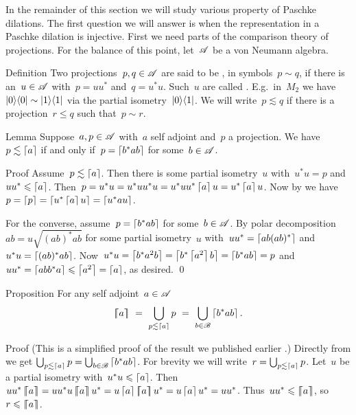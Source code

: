 \documentclass[b]{subfiles}
\begin{document}
\begin{parsec}%
\begin{point}%
In the remainder of this section we will study various property
    of Paschke dilations.
The first question we will answer is
    when the representation in a Paschke dilation is injective.
First we need parts of the comparison theory of projections.
For the balance of this point, let~$\mathscr{A}$ be a von Neumann algebra.
\end{point}
\begin{point}{Definition}%
Two projections~$p,q \in \mathscr{A}$ are said to be
    ,
    in symbols~$p \sim q$,
    if there is an~$u \in \mathscr{A}$
    with~$p = uu^*$ and~$q = u^*u$.
Such~$u$ are called .
E.g.~in~$M_2$ we have~$\left|0\right>\!\left<0\right| \sim \left|1\right>\!\left<1\right|$
    via the partial isometry~$\left|0\right>\!\left<1\right|$.
We will write~$p \lesssim q$
    if there is a projection~$r \leq q$
    such that~$p \sim r$.
\end{point}
\begin{point}{Lemma}%
Suppose~$a,p \in \mathscr{A}$ with~$a$ self adjoint and~$p$ a projection.
We have~$p \lesssim \left\lceil a\right\rceil$
    if and only if~$p = \left\lceil b^* a b\right\rceil$ for some~$b \in \mathscr{A}$.
\begin{point}{Proof}%
Assume~$p \lesssim \left\lceil a\right\rceil$.
Then there is some partial isometry~$u$
    with~$u^*u = p$ and~$uu^* \leqslant \left\lceil a\right\rceil$.
Then~$p = u^*u= u^*uu^*u = u^*uu^*\left\lceil a\right\rceil u = u^*\left\lceil a\right\rceil u$.
Now by  we have~$p = \left\lceil p\right\rceil = \left\lceil u^*\left\lceil a\right\rceil u\right\rceil=\left\lceil u^*au\right\rceil$.

For the converse, assume~$p = \left\lceil b^*ab\right\rceil$ for some~$b \in \mathscr{A}$.
By polar decomposition ~$ab = u \sqrt{(ab)^*ab}$
    for some partial isometry~$u$
    with~$uu^* = \left\lceil ab(ab)^*\right\rceil$ and~$u^*u = \left\lceil(ab)^*ab\right\rceil$.
Now~$u^*u = \left\lceil b^*a^2b\right\rceil = \left\lceil b^*\left\lceil a^2\right\rceil b\right\rceil = \left\lceil b^*ab\right\rceil=p$
and~$uu^* = \left\lceil abb^*a\right\rceil \leqslant \left\lceil a^2\right\rceil = \left\lceil a\right\rceil$, as desired. \qed
\end{point}
\end{point}
\begin{point}{Proposition}%
For any self adjoint~$a \in \mathscr{A}$
\begin{equation*}
    \left\lceil\!\!\left\lceil a\right\rceil\!\!\right\rceil \ =\  \bigcup_{p \lesssim \left\lceil a\right\rceil} p
\ = \ \bigcup_{b \in \mathscr{B}} \left\lceil b^*ab\right\rceil.
\end{equation*}
\begin{point}{Proof}%
(This is a simplified proof of the result we published
earlier \cite[Thm.~28 sub 1]{wwpaschke}.)
Directly from 
    we get $\bigcup_{p \lesssim \left\lceil a\right\rceil} p = \bigcup_{b \in \mathscr{B}} \left\lceil b^*ab\right\rceil$.
For brevity we will write~$r = \bigcup_{p \lesssim \left\lceil a\right\rceil} p$.
Let~$u$ be a partial isometry with~$u^*u \leqslant \left\lceil a\right\rceil$.
Then~$uu^*\cceil{a} = uu^*u \cceil{a} u^*= u \ceil{a} \cceil{a} u^*
        = u \ceil{a} u^*  = uu^*$.
Thus~$uu^* \leqslant \left\lceil\!\!\left\lceil a\right\rceil\!\!\right\rceil$, so~$r \leqslant \left\lceil\!\!\left\lceil a\right\rceil\!\!\right\rceil$.


\end{point}
\end{point}
\end{parsec}
\end{document}
